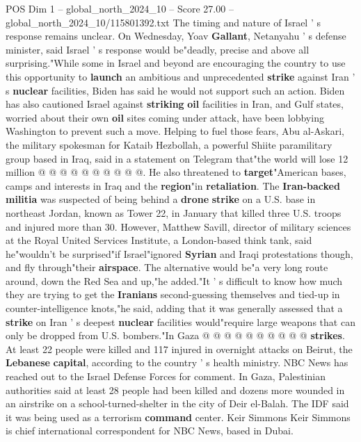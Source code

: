 \begin{textsample}{POS Dim 1 – global\_north\_2024\_10 – Score 27.00 – global\_north\_2024\_10/115801392.txt}
The timing and nature of Israel ' s response remains unclear.
On Wednesday, Yoav \textbf{Gallant}, Netanyahu ' s defense minister, said Israel ' s response would be"deadly, precise and above all surprising."While some in Israel and beyond are encouraging the country to use this opportunity to \textbf{launch} an ambitious and unprecedented \textbf{strike} against Iran ' s \textbf{nuclear} facilities, Biden has said he would not support such an action.
Biden has also cautioned Israel against \textbf{striking} \textbf{oil} facilities in Iran, and Gulf states, worried about their own \textbf{oil} sites coming under attack, have been lobbying Washington to prevent such a move.
Helping to fuel those fears, Abu al-Askari, the military spokesman for Kataib Hezbollah, a powerful Shiite paramilitary group based in Iraq, said in a statement on Telegram that"the world will lose 12 million @ @ @ @ @ @ @ @ @ @.
He also threatened to \textbf{target}"American bases, camps and interests in Iraq and the \textbf{region}"in \textbf{retaliation}.
The \textbf{Iran-backed} \textbf{militia} was suspected of being behind a \textbf{drone} \textbf{strike} on a U.S. base in northeast Jordan, known as Tower 22, in January that killed three U.S. troops and injured more than 30.
However, Matthew Savill, director of military sciences at the Royal United Services Institute, a London-based think tank, said he"wouldn't be surprised"if Israel"ignored \textbf{Syrian} and Iraqi protestations though, and fly through"their \textbf{airspace}.
The alternative would be"a very long route around, down the Red Sea and up,"he added."It ' s difficult to know how much they are trying to get the \textbf{Iranians} second-guessing themselves and tied-up in counter-intelligence knots,"he said, adding that it was generally assessed that a \textbf{strike} on Iran ' s deepest \textbf{nuclear} facilities would"require large weapons that can only be dropped from U.S. bombers."In Gaza @ @ @ @ @ @ @ @ @ @ \textbf{strikes}.
At least 22 people were killed and 117 injured in overnight attacks on Beirut, the \textbf{Lebanese} \textbf{capital}, according to the country ' s health ministry.
NBC News has reached out to the Israel Defense Forces for comment.
In Gaza, Palestinian authorities said at least 28 people had been killed and dozens more wounded in an airstrike on a school-turned-shelter in the city of Deir el-Balah.
The IDF said it was being used as a terrorism \textbf{command} center.
Keir Simmons Keir Simmons is chief international correspondent for NBC News, based in Dubai.

\end{textsample}
